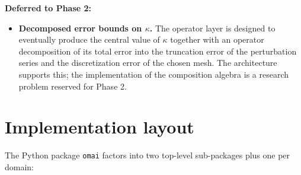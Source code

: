 \documentclass[11pt,a4paper]{article}
\begin{document}
\noindent\textbf{Deferred to Phase 2:}
\begin{itemize}[leftmargin=2em]
  \item \textbf{Decomposed error bounds on $\kappa$.} The operator layer is designed to eventually
        produce the central value of $\kappa$ together with an operator decomposition of its
        total error into the truncation error of the perturbation series and the discretization
        error of the chosen mesh. The architecture supports this; the implementation of the
        composition algebra is a research problem reserved for Phase 2.
\end{itemize}

\section{Implementation layout}
\label{sec:layout}

The Python package \texttt{omai} factors into two top-level sub-packages
plus one per domain:
\end{document}

